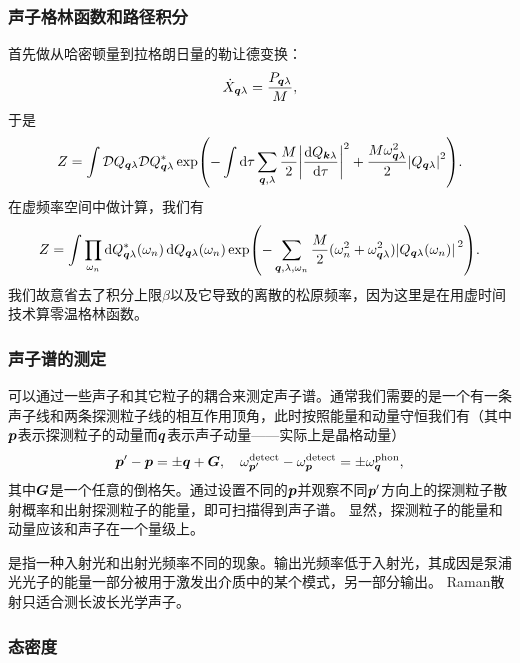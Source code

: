 \subsubsection{声子格林函数和路径积分}

首先做从哈密顿量到拉格朗日量的勒让德变换：
\[
    \dot{X}_{\vb*{q} \lambda} = \frac{P_{\vb*{q} \lambda}}{M},
\]
于是
\begin{equation}
    Z = \int \mathcal{D} Q_{\vb*{q} \lambda} \mathcal{D} Q^*_{\vb*{q} \lambda} \exp(- \int \dd{\tau} \sum_{\vb*{q}, \lambda} \frac{M}{2} \abs{\dv{Q_{\vb*{k} \lambda}}{\tau}}^2 + \frac{M \omega_{\vb*{q} \lambda}^2}{2} \abs{Q_{\vb*{q} \lambda}}^2 ).
\end{equation}
在虚频率空间中做计算，我们有
\begin{equation}
    Z = \int \prod_{\omega_n} \dd{Q_{\vb*{q} \lambda}^*(\omega_n)} \dd{Q_{\vb*{q} \lambda}(\omega_n)} \exp(- \sum_{\vb*{q}, \lambda, \omega_n} \frac{M}{2} (\omega_n^2 + \omega_{\vb*{q} \lambda}^2) \abs*{Q_{\vb*{q} \lambda}(\omega_n)}^2).
\end{equation}
我们故意省去了积分上限$\beta$以及它导致的离散的松原频率，因为这里是在用虚时间技术算零温格林函数。

\subsubsection{声子谱的测定}

可以通过一些声子和其它粒子的耦合来测定声子谱。通常我们需要的是一个有一条声子线和两条探测粒子线的相互作用顶角，此时按照能量和动量守恒我们有（其中$\vb*{p}$表示探测粒子的动量而$\vb*{q}$表示声子动量——实际上是晶格动量）
\begin{equation}
    \vb*{p}' - \vb*{p} = \pm \vb*{q} + \vb*{G}, \quad \omega^\text{detect}_{\vb*{p}'} - \omega^\text{detect}_{\vb*{p}} = \pm \omega^\text{phon}_{\vb*{q}},
\end{equation}
其中$\vb*{G}$是一个任意的倒格矢。通过设置不同的$\vb*{p}$并观察不同$\vb*{p}'$方向上的探测粒子散射概率和出射探测粒子的能量，即可扫描得到声子谱。
显然，探测粒子的能量和动量应该和声子在一个量级上。

是指一种入射光和出射光频率不同的现象。输出光频率低于入射光，其成因是泵浦光光子的能量一部分被用于激发出介质中的某个模式，另一部分输出。
Raman散射只适合测长波长光学声子。

\subsubsection{态密度}


